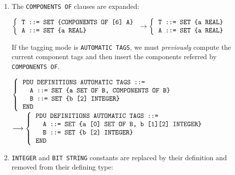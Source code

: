 \begin{enumerate}
  \item \label{COMPONENTS_OF_unfolding} The \texttt{\small COMPONENTS
  OF} clauses are expanded:

        \begin{center}
        {\small
         $\left\{
            \begin{tabular}{l}
               \verb+T ::= SET {COMPONENTS OF [6] A}+\\
               \verb+A ::= SET {a REAL}+
            \end{tabular}
          \right.
         \rightarrow
         \left\{
            \begin{tabular}{l}
              \verb+T ::= SET {a REAL}+\\
              \verb+A ::= SET {a REAL}+
            \end{tabular}
          \right.$}
         \end{center}

        If the tagging mode is \texttt{\small AUTOMATIC TAGS}, we must
        \emph{previously} compute the current component tags and then
        insert the components referred by \texttt{\small
        COMPONENTS OF}.

        \begin{center}
        {\small
         $\left\{
          \begin{tabular}{l}
             \verb+PDU DEFINITIONS AUTOMATIC TAGS ::=+\\
             \verb+  A ::= SET {a SET OF B, COMPONENTS OF B}+\\
             \verb+  B ::= SET {b [2] INTEGER}+\\
             \verb+END+
          \end{tabular}
          \right.$
          $\longrightarrow
          \left\{
          \begin{tabular}{l}
             \verb+PDU DEFINITIONS AUTOMATIC TAGS ::=+\\
             \verb+  A ::= SET {a [0] SET OF B, b [1][2] INTEGER}+\\
             \verb+  B ::= SET {b [2] INTEGER}+\\
             \verb+END+
          \end{tabular}
          \right.$
        }
        \end{center}

  \item \label{constants_unfolding}
        \texttt{\small INTEGER} and \texttt{\small BIT STRING}
        constants are replaced by their definition and removed from
        their defining type:


\end{enumerate}
